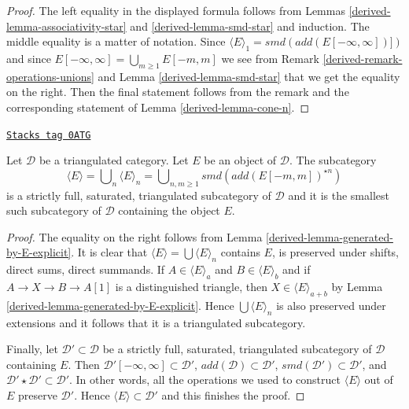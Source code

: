 \begin{proof}

The left equality in the displayed formula follows from
Lemmas \ref{derived-lemma-associativity-star} and \ref{derived-lemma-smd-star}
and induction. The middle equality is a matter of notation.
Since $\langle E \rangle_1 = smd(add(E[-\infty, \infty])])$
and since $E[-\infty, \infty] = \bigcup_{m \geq 1} E[-m, m]$
we see from Remark \ref{derived-remark-operations-unions} and
Lemma \ref{derived-lemma-smd-star} that we get the equality on the right.
Then the final statement follows from the remark and the
corresponding statement of Lemma \ref{derived-lemma-cone-n}.
\end{proof}

\begin{lemma}
\label{derived-lemma-find-smallest-containing-E}
\href{https://stacks.math.columbia.edu/tag/0ATG}{\texttt{Stacks tag 0ATG}}

Let $\mathcal{D}$ be a triangulated category. Let $E$ be an object
of $\mathcal{D}$. The subcategory
$$
\langle E \rangle = \bigcup\nolimits_n \langle E \rangle_n
= \bigcup\nolimits_{n, m \geq 1} smd(add(E[-m, m])^{\star n})
$$
is a strictly full, saturated, triangulated subcategory of $\mathcal{D}$
and it is the smallest such subcategory of $\mathcal{D}$ containing
the object $E$.
\end{lemma}

\begin{proof}

The equality on the right follows from
Lemma \ref{derived-lemma-generated-by-E-explicit}.
It is clear that $\langle E \rangle = \bigcup \langle E \rangle_n$
contains $E$, is preserved under shifts, direct sums, direct summands.
If $A \in \langle E \rangle_a$ and $B \in \langle E \rangle_b$
and if $A \to X \to B \to A[1]$ is a distinguished triangle, then
$X \in \langle E \rangle_{a + b}$ by Lemma \ref{derived-lemma-generated-by-E-explicit}.
Hence $\bigcup \langle E \rangle_n$ is also preserved under extensions
and it follows that it is a triangulated subcategory.

\medskip\noindent
Finally, let $\mathcal{D}' \subset \mathcal{D}$ be a
strictly full, saturated, triangulated subcategory of $\mathcal{D}$
containing $E$. Then
$\mathcal{D}'[-\infty, \infty] \subset \mathcal{D}'$,
$add(\mathcal{D}) \subset \mathcal{D}'$,
$smd(\mathcal{D}') \subset \mathcal{D}'$, and
$\mathcal{D}' \star \mathcal{D}' \subset \mathcal{D}'$.
In other words, all the operations we used to construct
$\langle E \rangle$ out of $E$ preserve $\mathcal{D}'$.
Hence $\langle E \rangle \subset \mathcal{D}'$ and this
finishes the proof.
\end{proof}

